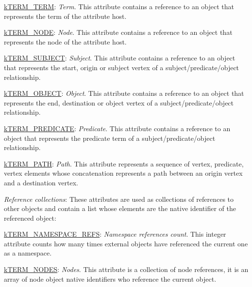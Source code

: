 \begin{DoxyItemize}
\begin{DoxyItemize}
\item {\ttfamily \hyperlink{}{k\-T\-E\-R\-M\-\_\-\-T\-E\-R\-M}}\-: {\itshape Term}. This attribute contains a reference to an object that represents the term of the attribute host. 
\item {\ttfamily \hyperlink{}{k\-T\-E\-R\-M\-\_\-\-N\-O\-D\-E}}\-: {\itshape Node}. This attribute contains a reference to an object that represents the node of the attribute host. 
\item {\ttfamily \hyperlink{}{k\-T\-E\-R\-M\-\_\-\-S\-U\-B\-J\-E\-C\-T}}\-: {\itshape Subject}. This attribute contains a reference to an object that represents the start, origin or subject vertex of a {\ttfamily subject}/{\ttfamily predicate}/{\ttfamily object} relationship. 
\item {\ttfamily \hyperlink{}{k\-T\-E\-R\-M\-\_\-\-O\-B\-J\-E\-C\-T}}\-: {\itshape Object}. This attribute contains a reference to an object that represents the end, destination or object vertex of a {\ttfamily subject}/{\ttfamily predicate}/{\ttfamily object} relationship. 
\item {\ttfamily \hyperlink{}{k\-T\-E\-R\-M\-\_\-\-P\-R\-E\-D\-I\-C\-A\-T\-E}}\-: {\itshape Predicate}. This attribute contains a reference to an object that represents the predicate term of a {\ttfamily subject}/{\ttfamily predicate}/{\ttfamily object} relationship. 
\item {\ttfamily \hyperlink{}{k\-T\-E\-R\-M\-\_\-\-P\-A\-T\-H}}\-: {\itshape Path}. This attribute represents a sequence of {\ttfamily vertex}, {\ttfamily predicate}, {\ttfamily vertex} elements whose concatenation represents a path between an origin vertex and a destination vertex. 
\end{DoxyItemize}
\item {\itshape Reference collections}\-: These attributes are used as collections of references to other objects and contain a list whose elements are the native identifier of the referenced object\-: 
\begin{DoxyItemize}
\item {\ttfamily \hyperlink{}{k\-T\-E\-R\-M\-\_\-\-N\-A\-M\-E\-S\-P\-A\-C\-E\-\_\-\-R\-E\-F\-S}}\-: {\itshape Namespace references count}. This integer attribute counts how many times external objects have referenced the current one as a namespace. 
\item {\ttfamily \hyperlink{}{k\-T\-E\-R\-M\-\_\-\-N\-O\-D\-E\-S}}\-: {\itshape Nodes}. This attribute is a collection of node references, it is an array of node object native identifiers who reference the current object. 

\end{DoxyItemize}
\end{DoxyItemize}
